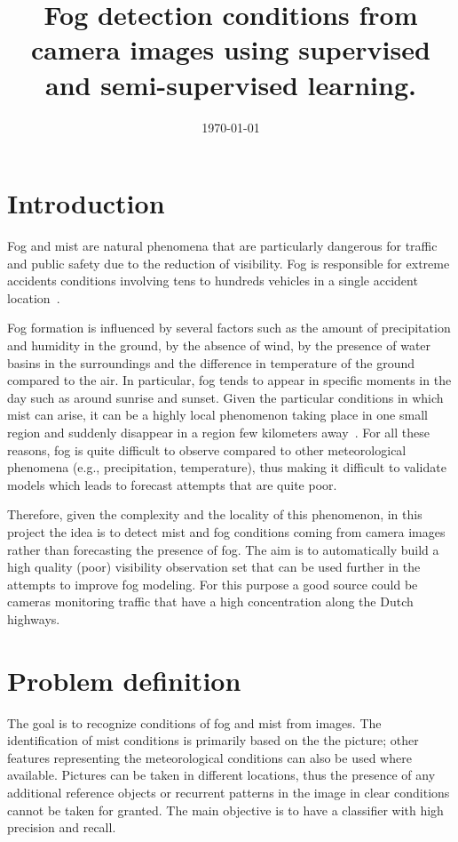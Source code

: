 \documentclass[conference]{IEEEtran}
\date{\today}
\author{
	\IEEEauthorblockN{Andrea Pagani}
	\IEEEauthorblockA{De Bilt, Netherlands\\ Email: andrea.pagani@knmi.nl}}
\title{
	Fog detection conditions from camera images using supervised and semi-supervised learning.
}
\begin{document}
\maketitle
\vspace{-0.2cm}
\section{Introduction}
Fog and mist are natural phenomena that are particularly dangerous for traffic and public safety due to the reduction of visibility. Fog is responsible for extreme accidents conditions involving tens to hundreds vehicles in a single accident location~\cite{hamilton2014hidden}.
 
Fog 
formation is influenced by several factors such as the amount of precipitation and humidity in the ground, by the absence of wind, by the 
presence of water basins in the surroundings and the difference in temperature of the ground compared to the air. In particular, 
fog tends to appear in specific moments in the day such as around sunrise and sunset.
Given the particular conditions in which mist can arise, it can be a highly local phenomenon taking 
place in one small region and suddenly disappear in a region few kilometers away~\cite{gultepe2007fog}.
For all these reasons, fog is quite difficult to observe compared to other meteorological phenomena (e.g., precipitation, temperature), 
thus making it difficult to validate models which leads to forecast attempts that are quite poor. 

Therefore, given the complexity and the locality of this phenomenon, in this project the idea is to detect mist and fog conditions coming from camera images rather than forecasting the 
presence of fog. The aim is to automatically build a high quality (poor) visibility observation set that can be used further in the attempts to improve fog modeling. For this purpose a good source could be cameras monitoring traffic that have a high concentration along the Dutch highways.
\vspace{-0.2cm}
\section{Problem definition}
The goal is to recognize conditions of fog and mist from images. The identification of mist conditions 
is primarily based on the the picture; other features representing the meteorological conditions can also be used where available. Pictures can be taken in different locations, thus the presence of any additional reference objects or recurrent patterns in the image in clear conditions cannot be taken for granted. 
The main objective is to have a classifier with high precision and recall.
\end{document}
